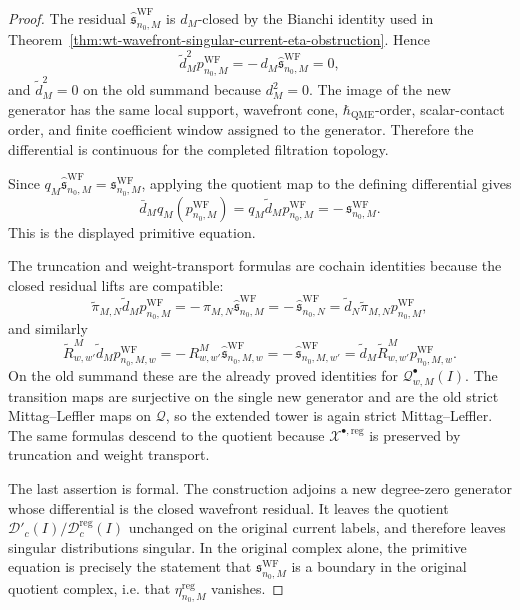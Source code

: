 \begin{proof}
  The residual
  \(\widehat{\mathfrak s}^{\mathrm{WF}}_{n_0,M}\) is \(d_M\)-closed by the
  Bianchi identity used in
  Theorem~\ref{thm:wt-wavefront-singular-current-eta-obstruction}.  Hence
  \[
    \widetilde d_M^2p^{\mathrm{WF}}_{n_0,M}
      =
    -\,d_M\widehat{\mathfrak s}^{\mathrm{WF}}_{n_0,M}=0,
  \]
  and \(\widetilde d_M^2=0\) on the old summand because \(d_M^2=0\).
  The image of the new generator has the same local support,
  wavefront cone, \(\hbar_{\mathrm{QME}}\)-order, scalar-contact order, and finite
  coefficient window assigned to the generator.  Therefore the
  differential is continuous for the completed filtration topology.

  Since
  \(q_M\widehat{\mathfrak s}^{\mathrm{WF}}_{n_0,M}
  =\mathfrak s^{\mathrm{WF}}_{n_0,M}\), applying the quotient map to the
  defining differential gives
  \[
    \bar d_Mq_M(p^{\mathrm{WF}}_{n_0,M})
      =
    q_M\widetilde d_Mp^{\mathrm{WF}}_{n_0,M}
      =
    -\,\mathfrak s^{\mathrm{WF}}_{n_0,M}.
  \]
  This is the displayed primitive equation.

  The truncation and weight-transport formulas are cochain identities
  because the closed residual lifts are compatible:
  \[
    \widetilde\pi_{M,N}\widetilde d_Mp^{\mathrm{WF}}_{n_0,M}
      =
    -\,\pi_{M,N}\widehat{\mathfrak s}^{\mathrm{WF}}_{n_0,M}
      =
    -\,\widehat{\mathfrak s}^{\mathrm{WF}}_{n_0,N}
      =
    \widetilde d_N\widetilde\pi_{M,N}p^{\mathrm{WF}}_{n_0,M},
  \]
  and similarly
  \[
    \widetilde R^M_{w,w'}\widetilde d_Mp^{\mathrm{WF}}_{n_0,M,w}
      =
    -\,R^M_{w,w'}\widehat{\mathfrak s}^{\mathrm{WF}}_{n_0,M,w}
      =
    -\,\widehat{\mathfrak s}^{\mathrm{WF}}_{n_0,M,w'}
      =
    \widetilde d_M\widetilde R^M_{w,w'}
      p^{\mathrm{WF}}_{n_0,M,w}.
  \]
  On the old summand these are the already proved identities for
  \(\mathcal Q^\bullet_{w,M}(I)\).  The transition maps are surjective on
  the single new generator and are the old strict Mittag--Leffler maps on
  \(\mathcal Q\), so the extended tower is again strict
  Mittag--Leffler.  The same formulas descend to the quotient because
  \(\mathcal X^{\bullet,\mathrm{reg}}\) is preserved by truncation and
  weight transport.

  The last assertion is formal.  The construction adjoins a new
  degree-zero generator whose differential is the closed wavefront
  residual.  It leaves the quotient
  \(\mathcal D'_c(I)/\mathcal D^{\mathrm{reg}}_c(I)\) unchanged on the
  original current labels, and therefore leaves singular distributions
  singular.  In the original complex alone, the primitive equation is
  precisely the statement that
  \(\mathfrak s^{\mathrm{WF}}_{n_0,M}\) is a boundary in the original
  quotient complex, i.e. that
  \(\eta^{\mathrm{reg}}_{n_0,M}\) vanishes.
\end{proof}

